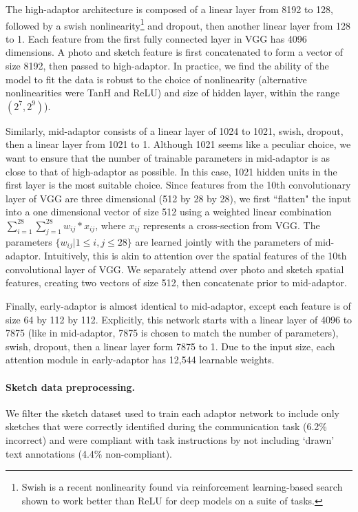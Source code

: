 \documentclass[9pt,twocolumn,twoside]{pnas-new}
\begin{document}
{The high-adaptor architecture is composed of a linear layer from 8192 to 128, followed by a swish nonlinearity\footnote{Swish is a recent nonlinearity found via reinforcement learning-based search shown to work better than ReLU for deep models on a suite of tasks.} \cite[]{ramachandran2018searching} and dropout, then another linear layer from 128 to 1. Each feature from the first fully connected layer in VGG has 4096 dimensions. A photo and sketch feature is first concatenated to form a vector of size 8192, then passed to high-adaptor. In practice, we find the ability of the model to fit the data is robust to the choice of nonlinearity (alternative nonlinearities were TanH and ReLU) and size of hidden layer, within the range $(2^{7},2^{9})$).

Similarly, mid-adaptor consists of a linear layer of 1024 to 1021, swish, dropout, then a linear layer from 1021 to 1. Although 1021 seems like a peculiar choice, we want to ensure that the number of trainable parameters in mid-adaptor is as close to that of high-adaptor as possible. In this case, 1021 hidden units in the first layer is the most suitable choice. Since features from the 10th convolutionary layer of VGG are three dimensional (512 by 28 by 28), we first ``flatten" the input into a one dimensional vector of size 512 using a weighted linear combination $\sum_{i=1}^{28}\sum_{j=1}^{28} w_{ij} * x_{ij}$, where $x_{ij}$ represents a cross-section from VGG. The parameters  $\{w_{ij}|1\leq i,j \leq 28\}$ are learned jointly with the parameters of mid-adaptor. Intuitively, this is akin to attention over the spatial features of the 10th convolutional layer of VGG. We separately attend over photo and sketch spatial features, creating two vectors of size 512, then concatenate prior to mid-adaptor.

Finally, early-adaptor is almost identical to mid-adaptor, except each feature is of size 64 by 112 by 112. Explicitly, this network starts with a linear layer of 4096 to 7875 (like in mid-adaptor, 7875 is chosen to match the number of parameters), swish, dropout, then a linear layer form 7875 to 1. Due to the input size, each attention module in early-adaptor has 12,544 learnable weights.

\paragraph{Sketch data preprocessing.} We filter the sketch dataset used to train each adaptor network to include only sketches that were correctly identified during the communication task (6.2\% incorrect) and were compliant with task instructions by not including `drawn' text annotations (4.4\% non-compliant).

}
\end{document}
